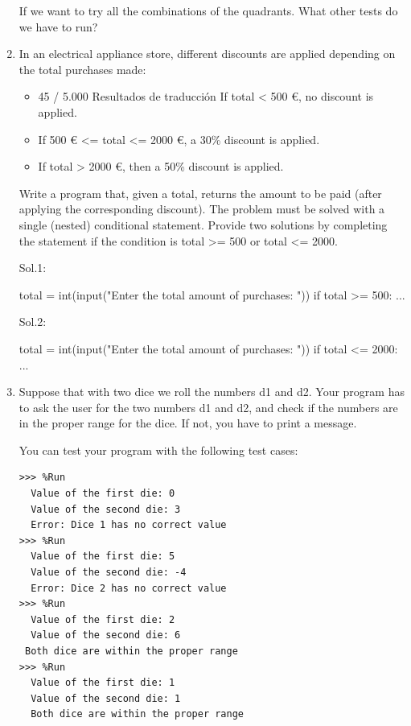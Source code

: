 \begin{enumerate}
 

If we want to try all the combinations of the quadrants. What other tests do we have to run?

\item In an electrical appliance store, different discounts are applied depending on the total purchases made:

\begin{itemize}
\item 45 / 5.000
Resultados de traducción
If total < 500 €, no discount is applied.
\item If 500 € <= total <= 2000 €, a 30\% discount is applied.
\item If total > 2000 €, then a 50\% discount is applied.
\end{itemize}


Write a program that, given a total, returns the amount to be paid (after applying the corresponding discount). The problem must be solved with a single (nested) conditional statement. Provide two solutions by completing the statement if the condition is total >= 500 or total <= 2000.

Sol.1:
\begin{python}
total = int(input("Enter the total amount of purchases: "))
if total >= 500:
...
\end{python}

Sol.2:
\begin{python}
total = int(input("Enter the total amount of purchases: "))
if total <= 2000:
...
\end{python}

\item Suppose that with two dice we roll the numbers d1 and d2. Your program has to ask the user for the two numbers d1 and d2, and check if the numbers are in the proper range for the dice. If not, you have to print a message.

You can test your program with the following test cases:

\begin{Verbatim}[frame=single, label={\em example test execution of the program}]
>>> %Run 
  Value of the first die: 0
  Value of the second die: 3
  Error: Dice 1 has no correct value
>>> %Run 
  Value of the first die: 5
  Value of the second die: -4
  Error: Dice 2 has no correct value
>>> %Run 
  Value of the first die: 2
  Value of the second die: 6
 Both dice are within the proper range
>>> %Run 
  Value of the first die: 1
  Value of the second die: 1
  Both dice are within the proper range
\end{Verbatim}





\end{enumerate}
